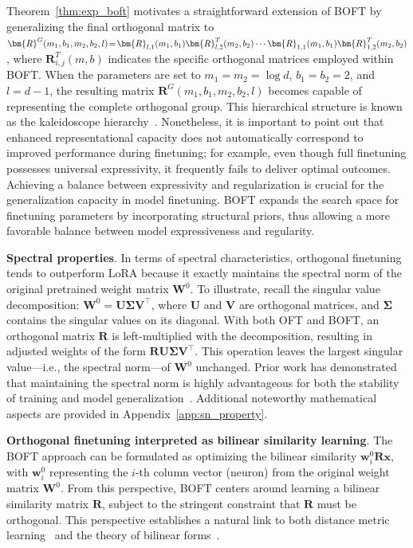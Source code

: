 Theorem~\ref{thm:exp_boft} motivates a straightforward extension of BOFT by generalizing the final orthogonal matrix to $\thickmuskip=2mu \medmuskip=2mu \bm{R}^G(m_1,b_1,m_2,b_2,l)=\bm{R}_{l,1}(m_1,b_1)\bm{R}_{l,2}^T(m_2,b_2)\cdots\bm{R}_{1,1}(m_1,b_1)\bm{R}_{1,2}^T(m_2,b_2)$, where $\bm{R}_{i,j}^T(m,b)$ indicates the specific orthogonal matrices employed within BOFT. When the parameters are set to $m_1=m_2=\log d$, $b_1=b_2=2$, and $l=d-1$, the resulting matrix $\bm{R}^G(m_1,b_1,m_2,b_2,l)$ becomes capable of representing the complete orthogonal group. This hierarchical structure is known as the kaleidoscope hierarchy~\cite{dao2019kaleidoscope}. Nonetheless, it is important to point out that enhanced representational capacity does not automatically correspond to improved performance during finetuning; for example, even though full finetuning possesses universal expressivity, it frequently fails to deliver optimal outcomes. Achieving a balance between expressivity and regularization is crucial for the generalization capacity in model finetuning. BOFT expands the search space for finetuning parameters by incorporating structural priors, thus allowing a more favorable balance between model expressiveness and regularity.

\textbf{Spectral properties}. In terms of spectral characteristics, orthogonal finetuning tends to outperform LoRA because it exactly maintains the spectral norm of the original pretrained weight matrix $\bm{W}^0$. To illustrate, recall the singular value decomposition: $\bm{W}^0=\bm{U}\bm{\Sigma}\bm{V}^\top$, where $\bm{U}$ and $\bm{V}$ are orthogonal matrices, and $\bm{\Sigma}$ contains the singular values on its diagonal. With both OFT and BOFT, an orthogonal matrix $\bm{R}$ is left-multiplied with the decomposition, resulting in adjusted weights of the form $\bm{R}\bm{U}\bm{\Sigma}\bm{V}^\top$. This operation leaves the largest singular value—i.e., the spectral norm—of $\bm{W}^0$ unchanged. Prior work has demonstrated that maintaining the spectral norm is highly advantageous for both the stability of training and model generalization~\cite{miyato2018spectral,yoshida2017spectral}. Additional noteworthy mathematical aspects are provided in Appendix~\ref{app:sn_property}.

\textbf{Orthogonal finetuning interpreted as bilinear similarity learning}. The BOFT approach can be formulated as optimizing the bilinear similarity $\bm{w}^0_i\bm{R}\bm{x}$, with $\bm{w}^0_i$ representing the $i$-th column vector (neuron) from the original weight matrix $\bm{W}^0$. From this perspective, BOFT centers around learning a bilinear similarity matrix $\bm{R}$, subject to the stringent constraint that $\bm{R}$ must be orthogonal. This perspective establishes a natural link to both distance metric learning~\cite{xing2002distance} and the theory of bilinear forms~\cite{roman2005advanced}.

